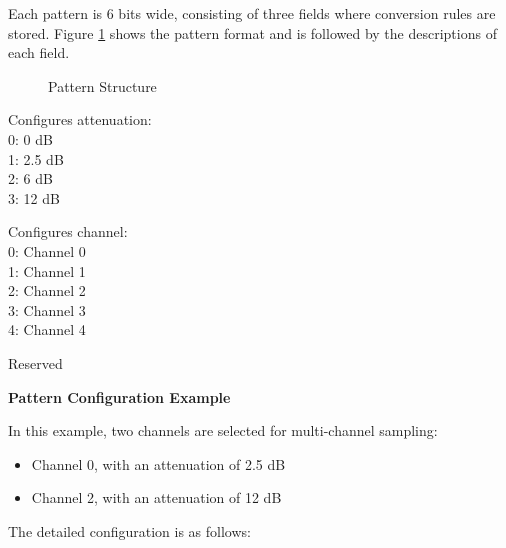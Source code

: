 \documentclass[main\_\_EN.tex]{subfiles}
\begin{document}
Each pattern is 6 bits wide, consisting of three fields where conversion rules are stored. Figure  \ref{fig:adc-pattern-table-entry} shows the pattern format and is followed by the descriptions of each field.

\begin{figure}[H]
\centering
{}%
%
%
\end{figure}
\vspace{-2em}
\begin{figure}[H]
    \centering
    \caption{Pattern Structure}
    \label{fig:adc-pattern-table-entry}
\end{figure}
\vspace{-2em}
\begin{regdesc}\begin{reglist}
\item [atten] Configures attenuation:\\
0: 0 dB\\
1: 2.5 dB\\
2: 6 dB\\
3: 12 dB
\item [ch\_sel] Configures channel:\\
0: Channel 0 \\
1: Channel 1 \\
2: Channel 2 \\
3: Channel 3 \\
4: Channel 4 \\
\item [(reserved)] Reserved
\end{reglist}\end{regdesc}

\textbf{Pattern Configuration Example}

In this example, two channels are selected for multi-channel sampling:

\begin{itemize}
    \item Channel 0, with an attenuation of 2.5 dB
    \item Channel 2, with an attenuation of 12 dB
\end{itemize}

The detailed configuration is as follows:
\end{document}
